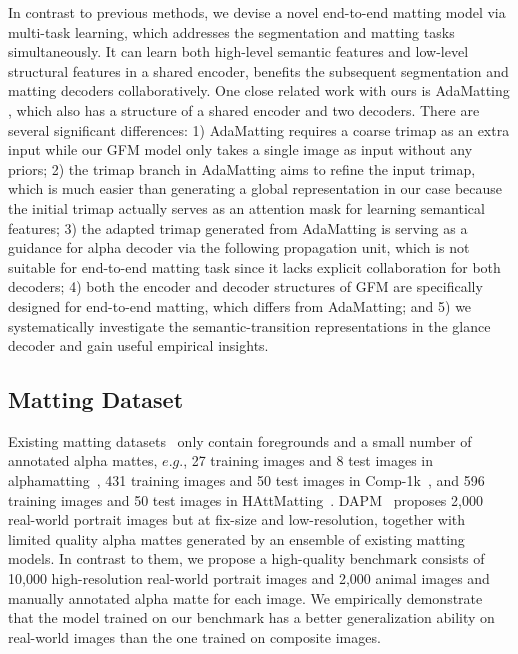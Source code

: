 \documentclass[twocolumn]{svjour3}
\begin{document}
In contrast to previous methods, we devise a novel end-to-end matting model via multi-task learning, which addresses the segmentation and matting tasks simultaneously. It can learn both high-level semantic features and low-level structural features in a shared encoder, benefits the subsequent segmentation and matting decoders collaboratively. One close related work with ours is AdaMatting \citep{cai2019disentangled}, which also has a structure of a shared encoder and two decoders. There are several significant differences: 1) AdaMatting requires a coarse trimap as an extra input while our GFM model only takes a single image as input without any priors; 2) the trimap branch in AdaMatting aims to refine the input trimap, which is much easier than generating a global representation in our case because the initial trimap actually serves as an attention mask for learning semantical features; 3) the adapted trimap generated from AdaMatting is serving as a guidance for alpha decoder via the following propagation unit, which is not suitable for end-to-end matting task since it lacks explicit collaboration for both decoders; 4) both the encoder and decoder structures of GFM are specifically designed for end-to-end matting, which differs from AdaMatting; and 5) we systematically investigate the semantic-transition representations in the glance decoder and gain useful empirical insights.


\subsection{Matting Dataset} 
Existing matting datasets~\citep{rhemann2009perceptually,xu2017deep,zhang2019late,Qiao_2020_CVPR} only contain foregrounds and a small number of annotated alpha mattes, $e.g.$, 27 training images and 8 test images in alphamatting~\citep{rhemann2009perceptually}, 431 training images and 50 test images in Comp-1k~\citep{xu2017deep}, and 596 training images and 50 test images in HAttMatting~\citep{Qiao_2020_CVPR}. DAPM~\citep{shen2016deep} proposes 2,000 real-world portrait images but at fix-size and low-resolution, together with limited quality alpha mattes generated by an ensemble of existing matting models. In contrast to them, we propose a high-quality benchmark consists of 10,000 high-resolution real-world portrait images and 2,000 animal images and manually annotated alpha matte for each image. We empirically demonstrate that the model trained on our benchmark has a better generalization ability on real-world images than the one trained on composite images.
\end{document}
